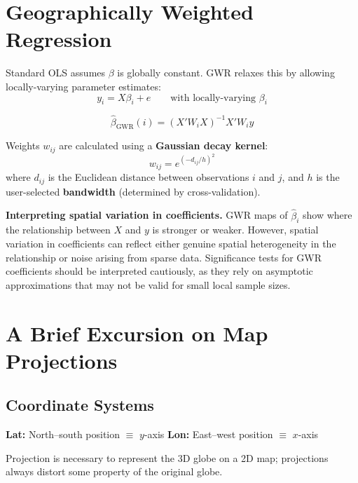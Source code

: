 \section{Geographically Weighted Regression}
\label{sec_GWR}

Standard OLS assumes $\beta$ is globally constant. GWR relaxes this by
allowing locally-varying parameter estimates:
\begin{equation}
  y_i = X\beta_i + e \qquad\text{with locally-varying }\beta_i
\end{equation}

\begin{tcolorbox}[keyresult]
\begin{equation}
  \hat\beta_\text{GWR}(i) = (X'W_iX)^{-1}X'W_iy
  \label{eq_GWR}
\end{equation}
\end{tcolorbox}

Weights $w_{ij}$ are calculated using a \textbf{Gaussian decay
kernel}:
\begin{equation}
  w_{ij} = e^{(-d_{ij}/h)^2}
\end{equation}
where $d_{ij}$ is the Euclidean distance between observations $i$ and $j$,
and $h$ is the user-selected \textbf{bandwidth}
(determined by cross-validation).

\noindent\textbf{Interpreting spatial variation in coefficients.}
GWR maps of $\hat\beta_i$ show where the relationship between $X$ and $y$
is stronger or weaker. However, spatial variation in coefficients can reflect
either genuine spatial heterogeneity in the relationship or noise arising from
sparse data. Significance tests for GWR coefficients should be interpreted
cautiously, as they rely on asymptotic approximations that may not be valid
for small local sample sizes.


\section{A Brief Excursion on Map Projections}
\label{sec_Projections_chap9}

\subsection{Coordinate Systems}

\noindent\textbf{Lat:} North--south position $\equiv$ $y$-axis\hfill
\noindent\textbf{Lon:} East--west position $\equiv$ $x$-axis

Projection is necessary to represent the 3D globe on a 2D map; projections
always distort some property of the original globe.


